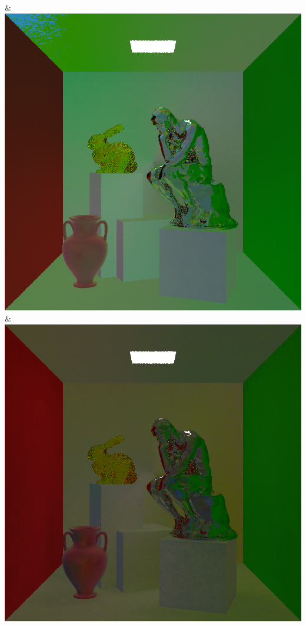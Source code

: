 & \includegraphics[width=\linewidth]{figures/py/tests/batch_size/5+nrc+pt+16_1spp.png}
& \includegraphics[width=\linewidth]{figures/py/tests/batch_size/25+nrc+pt+16_1spp.png}
